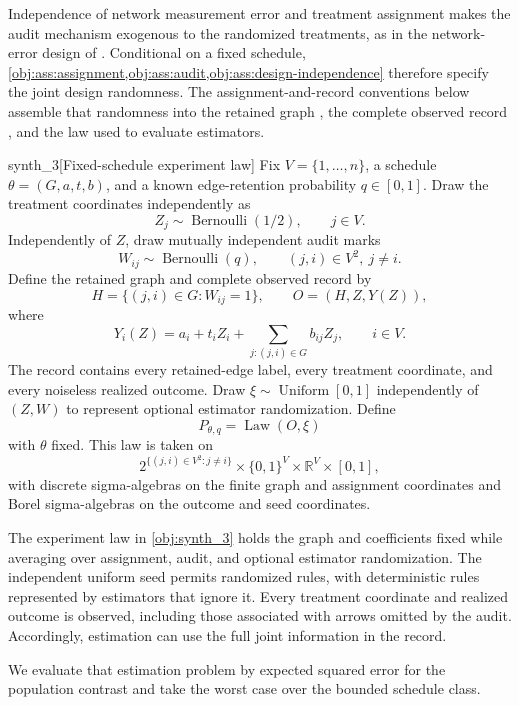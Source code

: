 Independence of network measurement error and treatment assignment makes the audit mechanism exogenous to the randomized treatments, as in the network-error design of \citep{LiSussmanKolaczyk2021NetworkNoise}. Conditional on a fixed schedule, \cref{obj:ass:assignment,obj:ass:audit,obj:ass:design-independence} therefore specify the joint design randomness. The assignment-and-record conventions below assemble that randomness into the retained graph , the complete observed record , and the law used to evaluate estimators.

\begin{definitionv}{synth_3}[Fixed-schedule experiment law]
Fix \(V=\{1,\ldots,n\}\), a schedule \(\theta=(G,a,t,b)\), and a known edge-retention probability \(q\in[0,1]\). Draw the treatment coordinates independently as
\[
Z_j\sim\operatorname{Bernoulli}(1/2),\qquad j\in V.
\]
Independently of \(Z\), draw mutually independent audit marks
\[
W_{ij}\sim\operatorname{Bernoulli}(q),
\qquad (j,i)\in V^2,\ j\ne i.
\]
Define the retained graph and complete observed record by
\[
H=\{(j,i)\in G:W_{ij}=1\},
\qquad
O=(H,Z,Y(Z)),
\]
where
\[
Y_i(Z)=a_i+t_iZ_i+\sum_{j:(j,i)\in G}b_{ij}Z_j,
\qquad i\in V.
\]
The record contains every retained-edge label, every treatment coordinate, and every noiseless realized outcome. Draw \(\xi\sim\operatorname{Uniform}[0,1]\) independently of \((Z,W)\) to represent optional estimator randomization. Define
\[
P_{\theta,q}=\operatorname{Law}(O,\xi)
\]
with \(\theta\) fixed. This law is taken on
\[
2^{\{(j,i)\in V^2:j\ne i\}}
\times\{0,1\}^V\times\mathbb R^V\times[0,1],
\]
with discrete sigma-algebras on the finite graph and assignment coordinates and Borel sigma-algebras on the outcome and seed coordinates.
\end{definitionv}

The experiment law  in \cref{obj:synth_3} holds the graph and coefficients fixed while averaging over assignment, audit, and optional estimator randomization. The independent uniform seed  permits randomized rules, with deterministic rules represented by estimators that ignore it. Every treatment coordinate and realized outcome is observed, including those associated with arrows omitted by the audit. Accordingly, estimation can use the full joint information in the record.

We evaluate that estimation problem by expected squared error for the population contrast and take the worst case over the bounded schedule class.

